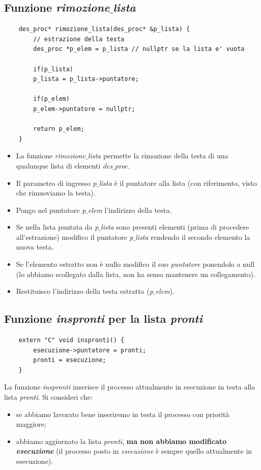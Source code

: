 \subsection{Funzione \emph{rimozione$\_$lista}}
\small
\begin{verbatim}
	des_proc* rimozione_lista(des_proc* &p_lista) {
		// estrazione della testa
		des_proc *p_elem = p_lista // nullptr se la lista e' vuota
		
		if(p_lista)
		p_lista = p_lista->puntatore;
		
		if(p_elem)
		p_elem->puntatore = nullptr;
		
		return p_elem;
	}
\end{verbatim}
\normalsize
\begin{itemize}
	\item La funzione \emph{rimozione$\_$lista} permette la rimozione della testa di una qualunque lista di elementi \emph{des$\_$proc}.
	\item Il parametro di ingresso \emph{p$\_$lista} è il puntatore alla lista (con riferimento, visto che rimuoviamo la testa).
	\item Pongo nel puntatore \emph{p$\_$elem} l'indirizzo della testa.
	\item Se nella lista puntata da \emph{p$\_$lista} sono presenti elementi (prima di procedere all'estrazione) modifico il puntatore \emph{p$\_$lista} rendendo il secondo elemento la nuova testa.
	\item Se l'elemento estratto non è nullo modifico il suo \emph{puntatore} ponendolo a null (lo abbiamo scollegato dalla lista, non ha senso mantenere un collegamento).
	\item Restituisco l'indirizzo della testa estratta (\emph{p$\_$elem}).
\end{itemize}

\subsection{Funzione \emph{inspronti} per la lista \emph{pronti}}
\small
\begin{verbatim}
	extern "C" void inspronti() {
		esecuzione->puntatore = pronti;
		pronti = esecuzione;
	}
\end{verbatim}
\normalsize 
La funzione \emph{inspronti} inserisce il processo attualmente in esecuzione in testa alla lista \emph{pronti}. Si consideri che:
\begin{itemize}
	\item se abbiamo lavorato bene inseriremo in testa il processo con priorità maggiore;
	\item abbiamo aggiornato la lista \emph{pronti}, \textbf{ma non abbiamo modificato \emph{esecuzione}} (il processo posto in \emph{esecuzione} è sempre quello attualmente in esecuzione).
\end{itemize}

